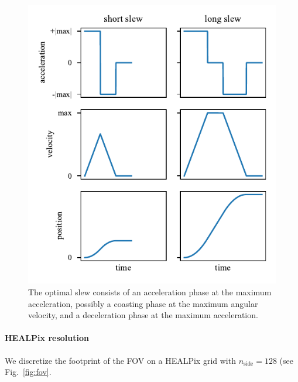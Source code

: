\documentclass[twocolumn,times]{aastex631}
\begin{document}
\begin{figure}
    \includegraphics[width=\columnwidth]{figures/slew}
    \caption{\label{fig:slew}The optimal slew consists of an acceleration phase at the maximum acceleration, possibly a coasting phase at the maximum angular velocity, and a deceleration phase at the maximum acceleration.}
\end{figure}

\paragraph{\ac{HEALPix} resolution}
We discretize the footprint of the \ac{FOV} on a \ac{HEALPix} grid with $n_\mathrm{side} = 128$ (see Fig.~\ref{fig:fov}.
\end{document}
